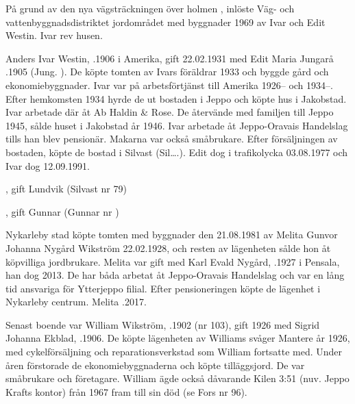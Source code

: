 
På grund av den nya vägsträckningen över holmen , inlöste Väg- och vattenbyggnadsdistriktet jordområdet med byggnader 1969 av Ivar och  Edit Westin.  Ivar rev husen.

Anders Ivar Westin, .1906 i Amerika, gift 22.02.1931 med Edit Maria Jungarå .1905  (Jung.       ).  De köpte tomten av Ivars föräldrar 1933 och byggde gård och ekonomiebyggnader. Ivar var på arbetsförtjänst till Amerika 1926-- och 1934--.  Efter hemkomsten 1934 hyrde de ut bostaden i Jeppo och köpte hus i Jakobstad. Ivar arbetade där åt Ab Haldin \& Rose. De återvände  med familjen till Jeppo 1945, sålde huset i Jakobstad år 1946. Ivar arbetade åt Jeppo-Oravais Handelslag tills han blev pensionär. Makarna var också småbrukare. Efter försäljningen av bostaden, köpte de bostad i Silvast (Sil….). Edit dog i trafikolycka 03.08.1977 och Ivar dog 12.09.1991.
\begin{jhchildren}
  \item {}, gift Lundvik (Silvast nr 79)
  \item {}, gift Gunnar (Gunnar nr  )
\end{jhchildren}




Nykarleby stad köpte tomten med byggnader den 21.08.1981 av Melita Gunvor Johanna Nygård \textborn Wikström 22.02.1928, och resten av lägenheten sålde hon åt köpvilliga jordbrukare. Melita var gift med Karl Evald Nygård, .1927 i Pensala, han dog 2013. De har båda arbetat åt Jeppo-Oravais Handelslag och var en lång tid ansvariga för Ytterjeppo filial. Efter pensioneringen köpte de lägenhet i Nykarleby centrum. Melita .2017.


Senast boende var William Wikström, .1902 (nr 103), gift 1926 med Sigrid Johanna Ekblad, .1906. De köpte lägenheten av Williams svåger Mantere år 1926, med cykelförsäljning och reparationsverkstad som William fortsatte med. Under åren förstorade de ekonomiebyggnaderna och köpte tilläggsjord. De var småbrukare och företagare. William ägde också dåvarande Kilen 3:51 (nuv. Jeppo Krafts kontor) från 1967 fram till sin död (se Fors nr 96).

